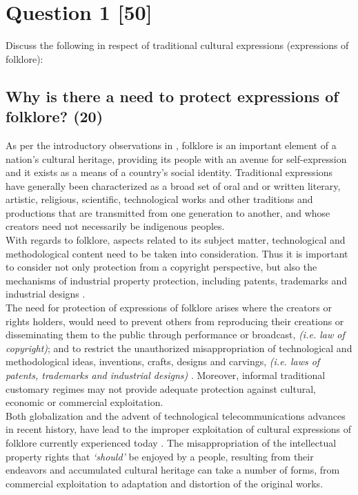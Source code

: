 \documentclass[11pt]{article}
\begin{document}
\section{Question 1 [50]}
\label{sec:orgd78e688}
Discuss the following in respect of traditional cultural expressions
(expressions of folklore):

\subsection{Why is there a need to protect expressions of folklore? (20)}
\label{sec:org3ee8197}

As per the introductory observations in
\cite{wipo85_model_provi_national_laws_folklore}, folklore is an important element
of a nation's cultural heritage, providing its people with an avenue for
self-expression and it exists as a means of a country's social identity.
Traditional expressions have generally been characterized as a broad set of oral
and or written literary, artistic, religious, scientific, technological works
and other traditions and productions that are transmitted from one generation to
another, and whose creators need not necessarily be indigenous peoples.\\

With regards to folklore, aspects related to its subject matter, technological
and methodological content need to be taken into consideration. Thus it is
important to consider not only protection from a copyright perspective, but also
the mechanisms of industrial property protection, including patents, trademarks
and industrial designs \cite{saurombe09_protection_indigenous_trad_knowl_through_ip}.\\

The need for protection of expressions of folklore arises where the creators or
rights holders, would need to prevent others from reproducing their creations or
disseminating them to the public through performance or broadcast, \emph{(i.e. law of
copyright)}; and to restrict the unauthorized misappropriation of technological
and methodological ideas, inventions, crafts, designs and carvings, \emph{(i.e. laws
of patents, trademarks and industrial designs)} \cite{masango10_indigenous_trad_knowl_protect_prospects}. Moreover, informal traditional
customary regimes may not provide adequate protection against cultural, economic
or commercial exploitation.\\

Both globalization and the advent of technological telecommunications advances
in recent history, have lead to the improper exploitation of cultural
expressions of folklore currently experienced today \cite{geyer10_towards_clearer_defin_underst_indi}. The misappropriation of the
intellectual property rights that \emph{`should'} be enjoyed by a people, resulting
from their endeavors and accumulated cultural heritage can take a number of
forms, from commercial exploitation to adaptation and distortion of the original
works.\\
\end{document}
